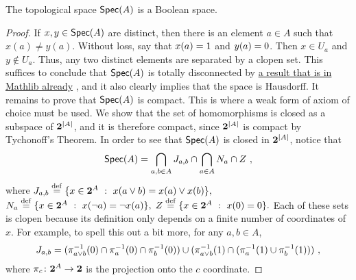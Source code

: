 \documentclass[a4paper,10pt]{article}
\numberwithin{theorem}{section}
\newcommand{\docref}[3]{%
    \href{%
        https://leanprover-community.github.io/mathlib4_docs/Mathlib/#1.html\##2%
    }{#3}%
}
\begin{document}
\begin{theorem}
    The topological space $\operatorname*{\mathsf{Spec}}(A)$ is a Boolean space.
\end{theorem}
\begin{proof}
    If $x, y \in \operatorname*{\mathsf{Spec}}(A)$ are distinct, then there is an element $a \in A$
    such that $x(a) \neq y(a)$. Without loss, say that $x(a) = 1$ and $y(a)
    = 0$. Then $x \in U_a$ and $y \not\in U_a$. Thus, any two distinct
    elements are separated by a clopen set. This suffices to conclude that
    $\operatorname*{\mathsf{Spec}}(A)$ is totally disconnected by
    \docref{Topology/Connected/TotallyDisconnected}
    {isTotallyDisconnected_of_isClopen_set}{a result that is in Mathlib
    already}, and it also clearly implies that the space is Hausdorff. It
    remains to prove that $\operatorname*{\mathsf{Spec}}(A)$ is compact. This is where a weak form of
    axiom of choice must be used. We show that the set of homomorphisms is
    closed as a subspace of $\mathbf{2}^{|A|}$, and it is therefore compact, since
    $\mathbf{2}^{|A|}$ is compact by Tychonoff's Theorem. In order to see that
    $\operatorname*{\mathsf{Spec}}(A)$ is closed in $\mathbf{2}^{|A|}$, notice that \[ \Spec(A) =
    \bigcap_{a,b\in A} J_{a,b} \cap \bigcap_{a \in A} N_a \cap Z \ , \]
    where $J_{a,b} \stackrel{\mathrm{def}}{=} \{ x \in \mathbf{2}^A \ : \ x(a \vee b) = x(a) \vee x(b)
    \},$ $N_a \stackrel{\mathrm{def}}{=}  \{x \in \mathbf{2}^A \ : \ x(\neg a) = \neg x(a) \},$ $Z
    \stackrel{\mathrm{def}}{=} \{ x \in \mathbf{2}^A \ : \ x(0) = 0\}.$ Each of these sets is
    clopen because its definition only depends on a finite number of
    coordinates of $x$. For example, to spell this out a bit more, for any $a,
    b \in A$,
    \[ J_{a,b} = 
        (\pi_{a \vee b}^{-1}(0) \cap \pi_{a}^{-1}(0) \cap
        \pi_{b}^{-1}(0)) \cup (\pi_{a \vee b}^{-1}(1) \cap
    (\pi_a^{-1}(1) \cup \pi_b^{-1}(1))) \ , \]
    where $\pi_c \colon \mathbf{2}^A \to \mathbf{2}$ is the projection onto the $c$
    coordinate.\qedhere

\end{proof}
\end{document}
